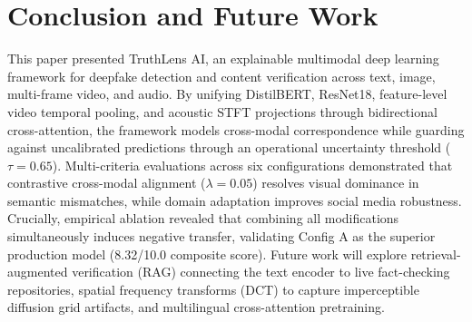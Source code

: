\documentclass[conference]{IEEEtran}
\begin{document}
\section{Conclusion and Future Work}
This paper presented TruthLens AI, an explainable multimodal deep learning framework for deepfake detection and content verification across text, image, multi-frame video, and audio. By unifying DistilBERT, ResNet18, feature-level video temporal pooling, and acoustic STFT projections through bidirectional cross-attention, the framework models cross-modal correspondence while guarding against uncalibrated predictions through an operational uncertainty threshold ($\tau = 0.65$). Multi-criteria evaluations across six configurations demonstrated that contrastive cross-modal alignment ($\lambda = 0.05$) resolves visual dominance in semantic mismatches, while domain adaptation improves social media robustness. Crucially, empirical ablation revealed that combining all modifications simultaneously induces negative transfer, validating Config A as the superior production model (8.32/10.0 composite score).
Future work will explore retrieval-augmented verification (RAG) connecting the text encoder to live fact-checking repositories, spatial frequency transforms (DCT) to capture imperceptible diffusion grid artifacts, and multilingual cross-attention pretraining.



\end{document}
